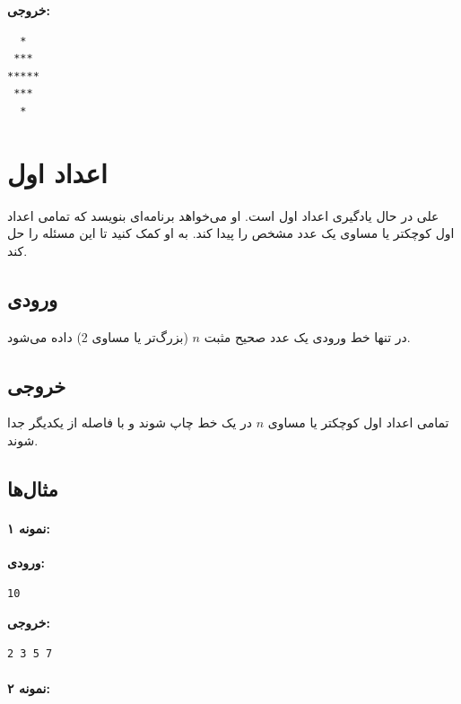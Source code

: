 \documentclass{article}
\begin{document}
\textbf{خروجی:}
\begin{LTR}
\begin{verbatim}
  *
 ***
*****
 ***
  *
\end{verbatim}
\end{LTR}

\newpage

\section{اعداد اول}

علی در حال یادگیری اعداد اول است. او می‌خواهد برنامه‌ای بنویسد که تمامی اعداد اول کوچکتر یا مساوی یک عدد مشخص را پیدا کند. به او کمک کنید تا این مسئله را حل کند.

\subsection{ورودی}

در تنها خط ورودی یک عدد صحیح مثبت \( n \) (بزرگ‌تر یا مساوی 2) داده می‌شود.

\subsection{خروجی}

تمامی اعداد اول کوچکتر یا مساوی \( n \) در یک خط چاپ شوند و با فاصله از یکدیگر جدا شوند.

\subsection{مثال‌ها}

\paragraph{نمونه ۱:}

\textbf{ورودی:}
\begin{LTR}
\begin{verbatim}
10
\end{verbatim}
\end{LTR}

\textbf{خروجی:}
\begin{LTR}
\begin{verbatim}
2 3 5 7
\end{verbatim}
\end{LTR}

\paragraph{نمونه ۲:}
\end{document}
